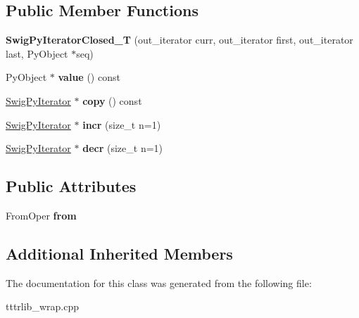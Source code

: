 \subsection*{Public Member Functions}
\begin{DoxyCompactItemize}
\item 
\mbox{\label{classswig_1_1_swig_py_iterator_closed___t_ae23b1da812fe9a789dcbc18b4db5ffe9}} 
{\bfseries Swig\+Py\+Iterator\+Closed\+\_\+T} (out\+\_\+iterator curr, out\+\_\+iterator first, out\+\_\+iterator last, Py\+Object $\ast$seq)
\item 
\mbox{\label{classswig_1_1_swig_py_iterator_closed___t_a4baeeb91419a21260b89205f325e0566}} 
Py\+Object $\ast$ {\bfseries value} () const
\item 
\mbox{\label{classswig_1_1_swig_py_iterator_closed___t_afa43a5af55b0f4ddee56308cb6c72eba}} 
\hyperlink{structswig_1_1_swig_py_iterator}{Swig\+Py\+Iterator} $\ast$ {\bfseries copy} () const
\item 
\mbox{\label{classswig_1_1_swig_py_iterator_closed___t_a1bf667d0f643064b452ecb2fc5e48df2}} 
\hyperlink{structswig_1_1_swig_py_iterator}{Swig\+Py\+Iterator} $\ast$ {\bfseries incr} (size\+\_\+t n=1)
\item 
\mbox{\label{classswig_1_1_swig_py_iterator_closed___t_aafae78acb63a1c4acaf2a76d4e9f6267}} 
\hyperlink{structswig_1_1_swig_py_iterator}{Swig\+Py\+Iterator} $\ast$ {\bfseries decr} (size\+\_\+t n=1)
\end{DoxyCompactItemize}
\subsection*{Public Attributes}
\begin{DoxyCompactItemize}
\item 
\mbox{\label{classswig_1_1_swig_py_iterator_closed___t_a8a87b95d1e7e7d0784866dc71189575d}} 
From\+Oper {\bfseries from}
\end{DoxyCompactItemize}
\subsection*{Additional Inherited Members}


The documentation for this class was generated from the following file\+:\begin{DoxyCompactItemize}
\item 
tttrlib\+\_\+wrap.\+cpp\end{DoxyCompactItemize}
